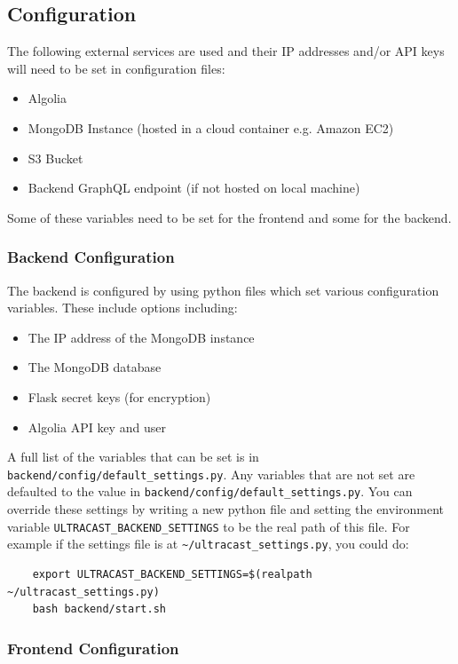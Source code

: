 \documentclass[../report.tex]{subfiles}
\begin{document}
\subsection{Configuration}

The following external services are used and their IP addresses and/or API keys will need to be set in configuration files:

\begin{itemize}
    \item Algolia
    \item MongoDB Instance (hosted in a cloud container e.g. Amazon EC2)
    \item S3 Bucket
    \item Backend GraphQL endpoint (if not hosted on local machine)
\end{itemize}

Some of these variables need to be set for the frontend and some for the backend.

\subsubsection{Backend Configuration} \label{sec:backend_config}

The backend is configured by using python files which set various configuration variables. These include options including:
\begin{itemize}
    \item The IP address of the MongoDB instance
    \item The MongoDB database
    \item Flask secret keys (for encryption)
    \item Algolia API key and user
\end{itemize}
A full list of the variables that can be set is in \verb|backend/config/default_settings.py|.
%
Any variables that are not set are defaulted to the value in \verb|backend/config/default_settings.py|.
You can override these settings by writing a new python file and setting the environment variable \verb|ULTRACAST_BACKEND_SETTINGS| to be the real path of this file. 
For example if the settings file is at \verb|~/ultracast_settings.py|, you could do:

\begin{verbatim}
    export ULTRACAST_BACKEND_SETTINGS=$(realpath ~/ultracast_settings.py)
    bash backend/start.sh
\end{verbatim}

\subsubsection{Frontend Configuration}
\end{document}
